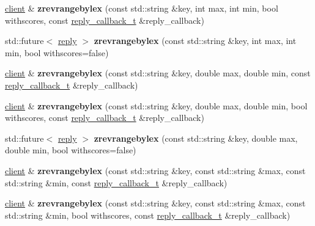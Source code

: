 \begin{DoxyCompactItemize}
\hyperlink{classcpp__redis_1_1client}{client} \& {\bfseries zrevrangebylex} (const std\+::string \&key, int max, int min, bool withscores, const \hyperlink{classcpp__redis_1_1client_a061a1140d36d2eaeda82b09a0bb3f9f2}{reply\+\_\+callback\+\_\+t} \&reply\+\_\+callback)
\item 
\mbox{\label{classcpp__redis_1_1client_a862509776d178c4efcc6567be70d261d}} 
std\+::future$<$ \hyperlink{classcpp__redis_1_1reply}{reply} $>$ {\bfseries zrevrangebylex} (const std\+::string \&key, int max, int min, bool withscores=false)
\item 
\mbox{\label{classcpp__redis_1_1client_afe98878a7d95157b859baeafe69bc539}} 
\hyperlink{classcpp__redis_1_1client}{client} \& {\bfseries zrevrangebylex} (const std\+::string \&key, double max, double min, const \hyperlink{classcpp__redis_1_1client_a061a1140d36d2eaeda82b09a0bb3f9f2}{reply\+\_\+callback\+\_\+t} \&reply\+\_\+callback)
\item 
\mbox{\label{classcpp__redis_1_1client_a217eef49f48f93a9f76bc12766db3fe9}} 
\hyperlink{classcpp__redis_1_1client}{client} \& {\bfseries zrevrangebylex} (const std\+::string \&key, double max, double min, bool withscores, const \hyperlink{classcpp__redis_1_1client_a061a1140d36d2eaeda82b09a0bb3f9f2}{reply\+\_\+callback\+\_\+t} \&reply\+\_\+callback)
\item 
\mbox{\label{classcpp__redis_1_1client_a16fa4ec5db2c6dbb7b7defb243fb83cb}} 
std\+::future$<$ \hyperlink{classcpp__redis_1_1reply}{reply} $>$ {\bfseries zrevrangebylex} (const std\+::string \&key, double max, double min, bool withscores=false)
\item 
\mbox{\label{classcpp__redis_1_1client_a1434f2ba0d6a1c63de1a7ad1219c9786}} 
\hyperlink{classcpp__redis_1_1client}{client} \& {\bfseries zrevrangebylex} (const std\+::string \&key, const std\+::string \&max, const std\+::string \&min, const \hyperlink{classcpp__redis_1_1client_a061a1140d36d2eaeda82b09a0bb3f9f2}{reply\+\_\+callback\+\_\+t} \&reply\+\_\+callback)
\item 
\mbox{\label{classcpp__redis_1_1client_a7334055d3b51f1b59efade093e0ee695}} 
\hyperlink{classcpp__redis_1_1client}{client} \& {\bfseries zrevrangebylex} (const std\+::string \&key, const std\+::string \&max, const std\+::string \&min, bool withscores, const \hyperlink{classcpp__redis_1_1client_a061a1140d36d2eaeda82b09a0bb3f9f2}{reply\+\_\+callback\+\_\+t} \&reply\+\_\+callback)

\end{DoxyCompactItemize}
